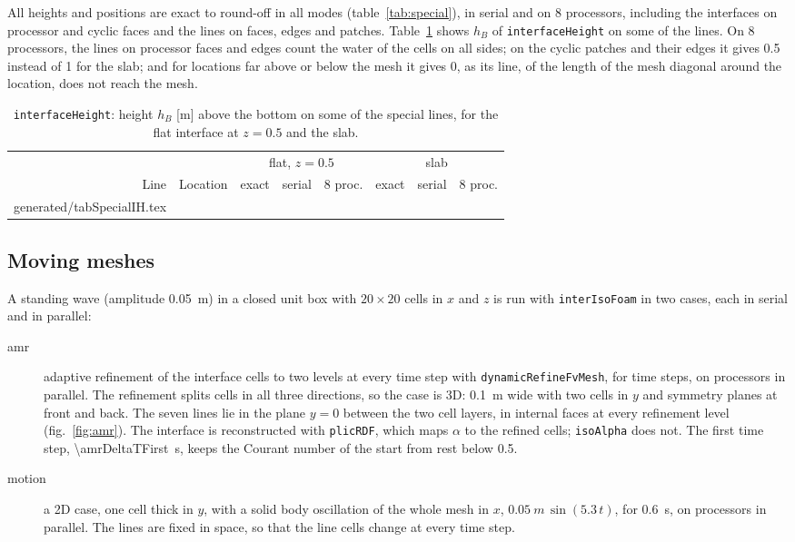 \documentclass[11pt,a4paper]{article}
\makeatletter
\newcommand{\inputrows}[1]{\@@input #1 }
\newcommand{\iH}{\texttt{interfaceHeight}}
\makeatother
\begin{document}
All heights and positions are exact to round-off in all modes
(table~\ref{tab:special}), in serial and on 8 processors, including the interfaces on processor and cyclic
faces and the lines on faces, edges and patches. Table~\ref{tab:specialIH}
shows $h_B$ of \iH{} on some of the lines. On 8 processors, the lines on
processor faces and edges count the water of the cells on all sides; on the
cyclic patches and their edges it gives 0.5 instead of 1 for the slab; and for
locations far above or below the mesh it gives 0, as its line, of the length
of the mesh diagonal around the location, does not reach the mesh.

\begin{table}[!htbp]
  \centering
  \caption{\iH{}: height $h_B$ [m] above the bottom on some of the special
    lines, for the flat interface at $z = 0.5$ and the slab.}
  \label{tab:specialIH}
  \begin{tabular}{rlcccccc}
    \toprule
    & & \multicolumn{3}{c}{flat, $z = 0.5$} & \multicolumn{3}{c}{slab} \\
    \cmidrule(lr){3-5} \cmidrule(lr){6-8}
    Line & Location & exact & serial & 8 proc. & exact & serial & 8 proc. \\
    \midrule
    \inputrows{generated/tabSpecialIH.tex}
    \bottomrule
  \end{tabular}
\end{table}

\subsection{Moving meshes}
\label{sec:moving}

A standing wave (amplitude \SI{0.05}{m}) in a closed unit box with
$20\times20$ cells in $x$ and $z$ is run with \texttt{interIsoFoam} in two
cases, each in serial and in parallel:
\begin{description}
\item[amr] adaptive refinement of the interface cells to two levels at every
  time step with \texttt{dynamicRefineFvMesh}, for \amrSteps{} time steps, on
  \amrProcs{} processors in parallel. The refinement splits cells in all three
  directions, so the case is 3D: \SI{0.1}{m} wide with two cells in $y$ and
  symmetry planes at front and back. The seven lines lie in the plane $y = 0$
  between the two cell layers, in internal faces at every refinement level
  (fig.~\ref{fig:amr}). The interface is reconstructed with
  \texttt{plicRDF}, which maps $\alpha$ to the refined cells;
  \texttt{isoAlpha} does not. The first time step, \SI{\amrDeltaTFirst}{s},
  keeps the Courant number of the start from rest below 0.5.
\item[motion] a 2D case, one cell thick in $y$, with a solid body oscillation
  of the whole mesh in $x$, $\SI{0.05}{m}\,\sin(5.3\,t)$, for \SI{0.6}{s},
  on \motionProcs{} processors in parallel. The lines are fixed in space, so
  that the line cells change at every time step.
\end{description}
\end{document}
